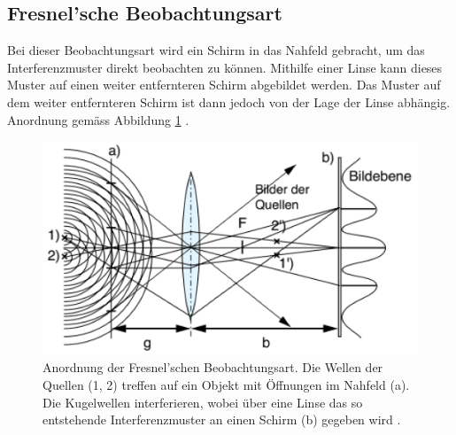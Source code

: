 \subsection{Fresnel'sche Beobachtungsart}
Bei dieser Beobachtungsart wird ein Schirm in das Nahfeld gebracht, um das Interferenzmuster direkt beobachten zu können. Mithilfe einer Linse kann dieses Muster auf einen weiter entfernteren Schirm abgebildet werden. Das Muster auf dem weiter entfernteren Schirm ist dann jedoch von der Lage der Linse abhängig. Anordnung gemäss Abbildung \ref{fig:Fresnel} \cite{Angaben2011}.\\
\begin{figure}[h]
\begin{center}
\includegraphics[scale=0.8]{Bilder/Fresnel.png} 
\end{center}
\caption[Anordnung der Fresnel'schen Beobachtungsart]{Anordnung der Fresnel'schen Beobachtungsart. Die Wellen der Quellen (1, 2) treffen auf ein Objekt mit Öffnungen im Nahfeld (a). Die Kugelwellen interferieren, wobei über eine Linse das so entstehende Interferenzmuster an einen Schirm (b) gegeben wird \cite{Angaben2011}.}
\label{fig:Fresnel}
\end{figure}

\newpage
